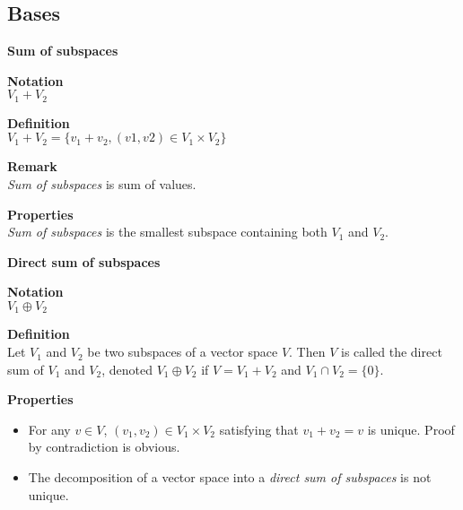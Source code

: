 \documentclass{article}
\begin{document}
\subsection{Bases}

\begin{framed}

    \textbf{Sum of subspaces}

    \begin{framed}
        \textbf{Notation}\\
        $V_{1}+V_{2}$
    \end{framed}

    \begin{framed}
        \textbf{Definition}\\
        $V_{1}+V_{2}=\{v_{1}+v_{2},(v1,v2)\in V_{1}\times V_{2}\}$
        \begin{framed}
        \textbf{Remark}\\
        \textit{Sum of subspaces} is sum of values.
        \end{framed}
    \end{framed}

    \begin{framed}
        \textbf{Properties}\\
        \textit{Sum of subspaces} is the smallest subspace containing both $V_{1}$ and $V_{2}$.
    \end{framed}

\end{framed}

\begin{framed}

    \textbf{Direct sum of subspaces}

    \begin{framed}
        \textbf{Notation}\\
        $V_{1}\oplus V_{2}$
    \end{framed}

    \begin{framed}
        \textbf{Definition}\\
        Let $V_{1}$ and $V_{2}$ be two subspaces of a vector space $V$. Then $V$ is called the direct sum of $V_{1}$ and $V_{2}$, denoted $V_{1} \oplus V_{2}$ if $V = V_{1}+V_{2}$ and $V_{1}\cap V_{2} = \{0\}$.
    \end{framed}

    \begin{framed}
        \textbf{Properties}
        \begin{itemize}
            \item For any $v\in V$, $(v_{1},v_{2})\in V_{1}\times V_{2}$ satisfying that $v_{1}+v_{2}=v$ is unique. Proof by contradiction is obvious.
            \item The decomposition of a vector space into a \textit{direct sum of subspaces} is not unique.
        \end{itemize}
    \end{framed}

\end{framed}
\end{document}
